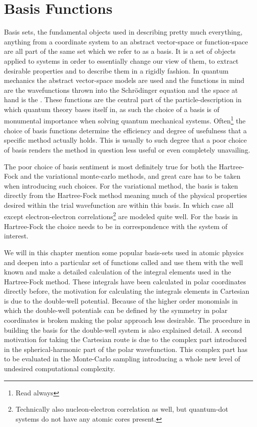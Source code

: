\chapter{Basis Functions\label{chapter:3}}
    Basis sets, the fundamental objects used in describing pretty much
    everything, anything from a coordinate system to an abstract vector-space
    or function-space are all part of the same set which we refer to as a
    basis. It is a set of objects applied to systems in order to essentially
    change our view of them, to extract desirable properties and to describe
    them in a rigidly fashion. In quantum mechanics the abstract vector-space
    models are used and the functions in mind are the wavefunctions thrown into
    the Schrödinger equation and the space at hand is the .  These functions are the central part of the particle-description
    in which quantum theory bases itself in, as such the choice of a basis is
    of monumental importance when solving quantum mechanical systems.
    Often\footnote{Read always} the choice of basis functions determine the
    efficiency and degree of usefulness that a specific method actually holds.
    This is usually to such degree that a poor choice of basis renders the
    method in question less useful or even completely unavailing.

    The poor choice of basis sentiment is most definitely true for both the
    Hartree-Fock and the variational monte-carlo methods, and great care has to
    be taken when introducing such choices. For the variational method, the
    basis is taken directly from the Hartree-Fock method meaning much of the
    physical properties desired within the trial wavefunction are within this
    basis. In which case all except electron-electron
    correlations\footnote{Technically also nucleon-electron correlation as
    well, but quantum-dot systems do not have any atomic cores present.} are
    modeled quite well. For the basis in Hartree-Fock the choice needs to be in
    correspondence with the system of interest.

    We will in this chapter mention some popular basis-sets used in atomic
    physics and deepen into a particular set of functions called
     and use them with the well known
     and make a detailed calculation of the integral
    elements used in the Hartree-Fock method. These integrals have been
    calculated in polar coordinates directly before\cite{anisimovas}, the
    motivation for calculating the integrals elements in Cartesian is due to
    the double-well potential. Because of the higher order monomials in which
    the double-well potentials can be defined by the symmetry in polar
    coordinates is broken making the polar approach less desirable. The
    procedure in building the basis for the double-well system is also
    explained detail. A second motivation for taking the Cartesian route is due
    to the complex part introduced in the spherical-harmonic part of the polar
    wavefunction. This complex part has to be evaluated in the Monte-Carlo
    sampling introducing a whole new level of undesired computational
    complexity.

